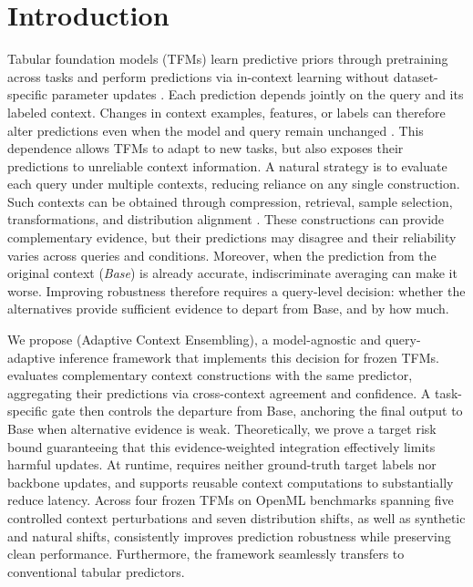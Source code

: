 \section{Introduction}
\label{sec:introduction}

Tabular foundation models (TFMs) learn predictive priors through pretraining
across tasks and perform predictions via in-context learning without
dataset-specific parameter updates
\citep{muller2023tabpfn,hollmann2025tabpfn,qu2025tabicl,ma2025tabdpt}.
Each prediction depends jointly on the query and its labeled context. Changes
in context examples, features, or labels can therefore alter predictions even
when the model and query remain unchanged
\citep{abdullah2026contextsampling}. This dependence allows TFMs to adapt to
new tasks, but also exposes their predictions to unreliable context
information. A natural strategy is to evaluate each query under multiple
contexts, reducing reliance on any single construction. Such contexts can be
obtained through compression, retrieval, sample selection, transformations,
and distribution alignment
\citep{feuer2024tunetables,thomas2024localpfn,xu2025mixturepfn,
treerath2026tabaicl,hollmann2025tabpfn,khalifa2023dense}. These constructions
can provide complementary evidence, but their predictions may disagree and
their reliability varies across queries and conditions. Moreover, when the
prediction from the original context (\emph{Base}) is already accurate,
indiscriminate averaging can make it worse. Improving robustness therefore
requires a query-level decision: whether the alternatives provide sufficient
evidence to depart from Base, and by how much.

We propose \method{} (Adaptive Context Ensembling), a model-agnostic and
query-adaptive inference framework that implements this decision for frozen
TFMs. \method{} evaluates complementary context constructions with the same
predictor, aggregating their predictions via cross-context agreement and
confidence. A task-specific gate then controls the departure from Base,
anchoring the final output to Base when alternative evidence is weak.
Theoretically, we prove a target risk bound guaranteeing that this
evidence-weighted integration effectively limits harmful updates. At runtime,
\method{} requires neither ground-truth target labels nor backbone updates, and
supports reusable context computations to substantially reduce latency. Across
four frozen TFMs on OpenML benchmarks spanning five controlled context
perturbations and seven distribution shifts, as well as synthetic and natural
shifts, \method{} consistently improves prediction robustness while preserving
clean performance. Furthermore, the framework seamlessly transfers to
conventional tabular predictors.

